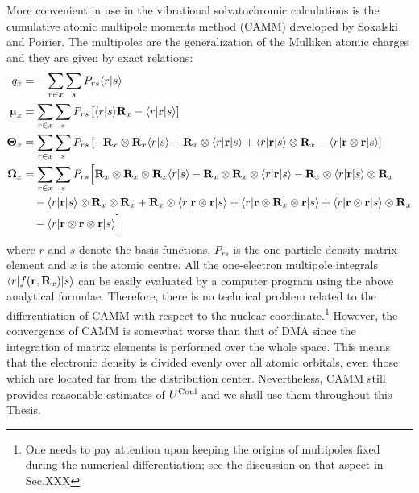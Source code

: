 \documentclass[a4paper,titlepage,twoside,fleqn,12pt]{book}
\begin{document}
\begin{appendices}
\begin{refsection}
More convenient in use in the vibrational solvatochromic calculations
is the cumulative atomic multipole
moments method (CAMM) developed by Sokalski and Poirier.\citep{Sokalski.Poirier.CPL.1983}
The multipoles are the generalization of the Mulliken atomic charges
and they are given by exact relations:
%
\begin{equation}
\begin{aligned}
q_x              &=-\sum_{r\in x} \sum_s  P_{rs} \langle r \rvert s \rangle \\
\bm{\upmu}_x     &= \sum_{r\in x} \sum_s  P_{rs} 
\left[
        \langle r \rvert s \rangle {\bf R}_x - \langle r \lvert {\bf r} \rvert s \rangle
\right]   \\
\bm{\Theta}_{x}  &= \sum_{r\in x} \sum_s P_{rs}
\left[
   - {\bf R}_x \otimes {\bf R}_x \langle r \rvert s \rangle +
    {\bf R}_x \otimes  \langle r \lvert {\bf r} \rvert s \rangle + 
                       \langle r \lvert {\bf r} \rvert s \rangle \otimes {\bf R}_x -
    \langle r \lvert {\bf r} \otimes {\bf r} \rvert s \rangle
\right]   \\
\bm{\Omega}_{x}  &=
\sum_{r\in x} \sum_s P_{rs}
\Big[
          {\bf R}_x \otimes {\bf R}_x \otimes {\bf R}_x \langle r \rvert s \rangle -
          {\bf R}_x \otimes {\bf R}_x \otimes \langle r \lvert {\bf r} \rvert s \rangle -
          {\bf R}_x \otimes \langle r \lvert {\bf r} \rvert s \rangle \otimes {\bf R}_x \\ \nonumber
 &\quad- \langle r \lvert {\bf r} \rvert s \rangle \otimes {\bf R}_x \otimes {\bf R}_x +
          {\bf R}_x \otimes \langle r \lvert {\bf r} \otimes {\bf r} \rvert s \rangle +
          \langle r \lvert {\bf r} \otimes {\bf R}_x \otimes {\bf r} \rvert s \rangle +
          \langle r \lvert {\bf r} \otimes {\bf r} \rvert s \rangle \otimes {\bf R}_x \\ \nonumber
 &\quad- \langle r \lvert {\bf r} \otimes {\bf r} \otimes {\bf r} \rvert s \rangle
\Big] 
\end{aligned}
\end{equation}
%
where $r$ and $s$ denote the basis functions, $P_{rs}$ is the
one\hyp{}particle density matrix element and $x$ is the atomic centre.
All the one\hyp{}electron multipole integrals 
$\langle r \lvert f({\bf r},{\bf R}_x)\rvert s \rangle$ 
can be easily 
evaluated by a computer program using the above analytical formulae.
Therefore, there is no technical problem related to the differentiation of CAMM
with respect to the nuclear coordinate.\footnote{One needs to pay attention
upon keeping the origins of multipoles fixed during the numerical differentiation;
see the discussion on that aspect in Sec.XXX} However, the convergence of CAMM
is somewhat worse than that of DMA since the integration of matrix elements 
is performed over the whole space. This means that the electronic density
is divided evenly over all atomic orbitals, even those which are located far
from the distribution center. Nevertheless, CAMM still provides reasonable 
estimates of $U^{\rm Coul}$ and we shall use them throughout this Thesis.


\end{refsection}
\end{appendices}
\end{document}
